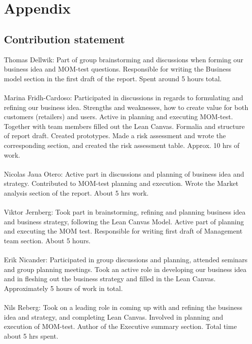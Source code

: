 \documentclass[titlepage]{article}
\begin{document}
\section{Appendix}
\subsection{Contribution statement}
Thomas Dellwik: Part of group brainstorming and discussions when forming our business idea and MOM-test questions. Responsible for writing the Business model section in the first draft of the report. Spent around 5 hours total. \\
\\
Marina Fridh-Cardoso: Participated in discussions in regards to formulating and refining our business idea. Strengths and weaknesses, how to create value for both customers (retailers) and users. Active in planning and executing MOM-test. Together with team members filled out the Lean Canvas. Formalia and structure of report draft. Created prototypes. Made a risk assessment and wrote the corresponding section, and created the risk assessment table. Approx. 10 hrs of work. \\
\\
Nicolas Jaua Otero: Active part in discussions and planning of business idea and strategy. Contributed to MOM-test planning and execution. Wrote the Market analysis section of the report. About 5 hrs work.\\
\\
Viktor Jernberg: Took part in brainstorming, refining and planning business idea and business strategy, following the Lean Canvas Model. Active part of planning and executing the MOM test. Responsible for writing first draft of Management team section. About 5 hours.\\
\\
Erik Nicander: Participated in group discussions and planning, attended seminars and group planning meetings. Took an active role in developing our business idea and in fleshing out the business strategy and filled in the Lean Canvas. Approximately 5 hours of work in total.\\
\\
Nils Reberg: Took on a leading role in coming up with and refining the business idea and strategy, and completing Lean Canvas.  Involved in planning and execution of MOM-test. Author of the Executive summary section. Total time about 5 hrs spent.\\








 
 
 
\end{document}
